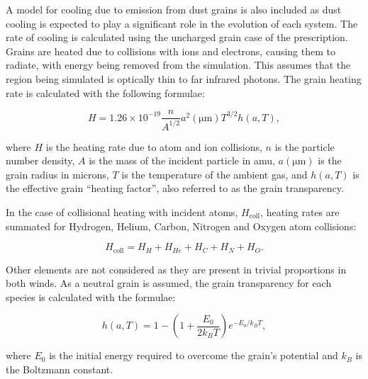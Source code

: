 A model for cooling due to emission from dust grains is also included as dust cooling is expected to play a significant role in the evolution of each system.
The rate of cooling is calculated using the uncharged grain case of the \textcite{dwek_infrared_1981} prescription.
Grains are heated due to collisions with ions and electrons, causing them to radiate, with energy being removed from the simulation.
This assumes that the region being simulated is optically thin to far infrared photons.
The grain heating rate is calculated with the following formulae:

\begin{equation}
    H = 1.26 \times 10^{-19} \frac{n}{A^{1/2}} a^2(\si{\micro\metre}) T^{3/2} h(a,T) , 
\end{equation}

\noindent
where $H$ is the heating rate due to atom and ion collisions, 
$n$ is the particle number density,
$A$ is the mass of the incident particle in amu,
$a(\si{\micro\metre})$ is the grain radius in microns,
$T$ is the temperature of the ambient gas,
and $h(a,T)$ is the effective grain ``heating factor'', also referred to as the grain transparency. 

In the case of collisional heating with incident atoms, $H_\text{coll}$, heating rates are summated for Hydrogen, Helium, Carbon, Nitrogen and Oxygen atom collisions:

\begin{equation}
  H_\text{coll} = H_H + H_{He} + H_{C} + H_{N} + H_{O} .
\end{equation}

\noindent
Other elements are not considered as they are present in trivial proportions in both winds.
As a neutral grain is assumed, the grain transparency for each species is calculated with the formulae:

\begin{equation}
  h(a,T) = 1 - \left( 1 + \frac{E_0}{2 k_B T} \right) e^{- E_0 / k_B T} ,
\end{equation}

\noindent
where $E_0$ is the initial energy required to overcome the grain's potential and $k_B$ is the Boltzmann constant.


